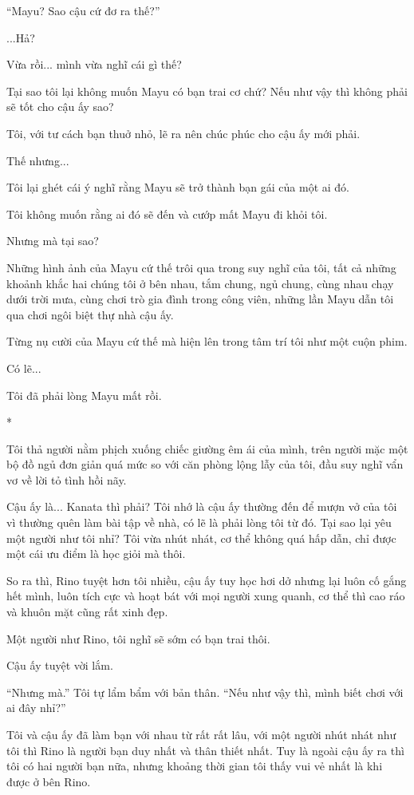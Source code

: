 {    ``Mayu? Sao cậu cứ đơ ra thế?''

    ...Hả?

    Vừa rồi... mình vừa nghĩ cái gì thế?

    Tại sao tôi lại không muốn Mayu có bạn trai cơ chứ? Nếu như vậy thì
    không phải sẽ tốt cho cậu ấy sao?

    Tôi, với tư cách bạn thuở nhỏ, lẽ ra nên chúc phúc cho cậu ấy mới phải.

    Thế nhưng...

    Tôi lại ghét cái ý nghĩ rằng Mayu sẽ trở thành bạn gái của một ai đó.

    Tôi không muốn rằng ai đó sẽ đến và cướp mất Mayu đi khỏi tôi.

    Nhưng mà tại sao?

    Những hình ảnh của Mayu cứ thế trôi qua trong suy nghĩ của tôi, tất cả
    những khoảnh khắc hai chúng tôi ở bên nhau, tắm chung, ngủ chung, cùng
    nhau chạy dưới trời mưa, cùng chơi trò gia đình trong công viên, những
    lần Mayu dẫn tôi qua chơi ngôi biệt thự nhà cậu ấy.

    Từng nụ cười của Mayu cứ thế mà hiện lên trong tâm trí tôi như một cuộn
    phim.

    Có lẽ...

    Tôi đã phải lòng Mayu mất rồi.

    *

    Tôi thả người nằm phịch xuống chiếc giường êm ái của mình, trên người
    mặc một bộ đồ ngủ đơn giản quá mức so với căn phòng lộng lẫy của tôi,
    đầu suy nghĩ vẩn vơ về lời tỏ tình hồi nãy.

    Cậu ấy là... Kanata thì phải? Tôi nhớ là cậu ấy thường đến để mượn vở
    của tôi vì thường quên làm bài tập về nhà, có lẽ là phải lòng tôi từ đó.
    Tại sao lại yêu một người như tôi nhỉ? Tôi vừa nhút nhát, cơ thể không
    quá hấp dẫn, chỉ được một cái ưu điểm là học giỏi mà thôi.

    So ra thì, Rino tuyệt hơn tôi nhiều, cậu ấy tuy học hơi dở nhưng lại
    luôn cố gắng hết mình, luôn tích cực và hoạt bát với mọi người xung
    quanh, cơ thể thì cao ráo và khuôn mặt cũng rất xinh đẹp.

    Một người như Rino, tôi nghĩ sẽ sớm có bạn trai thôi.

    Cậu ấy tuyệt vời lắm.

    ``Nhưng mà.'' Tôi tự lẩm bẩm với bản thân. ``Nếu như vậy thì, mình biết
    chơi với ai đây nhỉ?''

    Tôi và cậu ấy đã làm bạn với nhau từ rất rất lâu, với một người nhút
    nhát như tôi thì Rino là người bạn duy nhất và thân thiết nhất. Tuy là
    ngoài cậu ấy ra thì tôi có hai người bạn nữa, nhưng khoảng thời gian tôi
    thấy vui vẻ nhất là khi được ở bên Rino.

}
